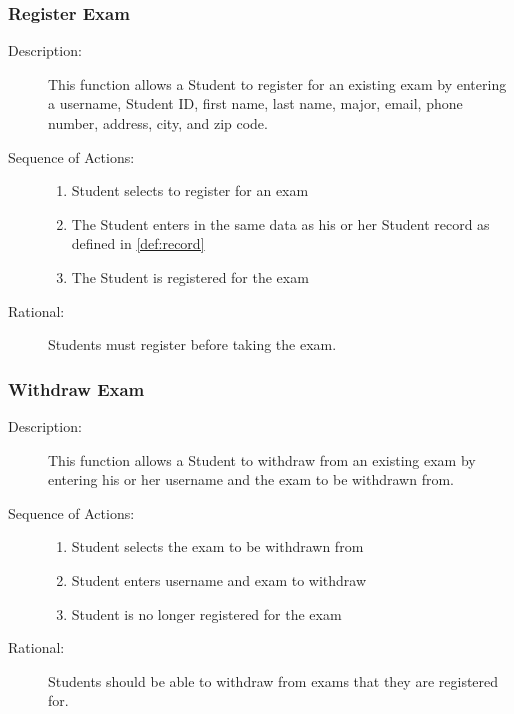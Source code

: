 \subsubsection{\large Register Exam} 
\begin{boxed} %
      \begin{description}
         \item[Description:\label{desc:}]
   This function allows a Student to register for an existing exam by entering a
   username, Student ID, first name, last name, major, email, phone number,
   address, city, and zip code.
         
            \item[Sequence of Actions:]\hspace{10cm}
         \begin{enumerate}
            \item Student selects to register for an exam
            \item The Student enters in the same data as his or her Student
               record as defined in \ref{def:record}
            \item The Student is registered for the exam
         \end{enumerate}

            \item[Rational:]
               Students must register before taking the exam.
      \end{description}
   \end{boxed} %

   \subsubsection{\large Withdraw Exam} 
   \begin{boxed} %
      \begin{description}
         \item[Description:\label{desc:withdraw_exam}]
      This function allows a Student to withdraw from an existing exam by
      entering his or her username and the exam to be withdrawn from.
         
            \item[Sequence of Actions:]\hspace{10cm}
         \begin{enumerate}
            \item Student selects the exam to be withdrawn from
            \item Student enters username and exam to withdraw
            \item Student is no longer registered for the exam
         \end{enumerate}

            \item[Rational:]
               Students should be able to withdraw from exams that they are
               registered for.
      \end{description}
   \end{boxed} %

